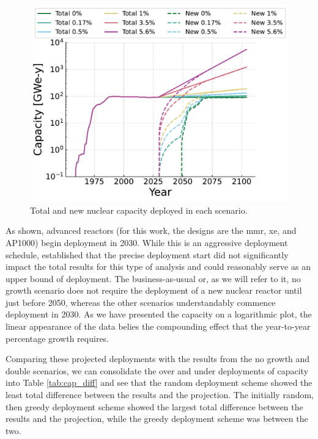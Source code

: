 \begin{figure}[H]
    \centering
    \includegraphics[scale=0.7]{images/results/deployment_calcs/total_new_capacity_scenarios.pdf}
    \caption{Total and new nuclear capacity deployed in each scenario.}
    \label{fig:dep_goals}
\end{figure}

As shown, advanced reactors (for this work, the designs are the \gls{mmr},
\gls{xe}, and AP1000) begin deployment in 2030. While this is an aggressive deployment schedule, \cite{bachmann_thesis_2023} established that the precise deployment start did not significantly impact the total results for this type of analysis and could reasonably serve as an upper bound of deployment. The business-as-usual or, as we will refer to it, no growth scenario does not require the deployment of a new nuclear reactor until just before 2050, whereas the other scenarios understandably commence deployment in 2030. As we have presented the capacity on a logarithmic plot, the linear appearance of the data belies the compounding effect that the year-to-year percentage growth requires.

Comparing these projected deployments with the results from the no growth and double scenarios, we can consolidate the over and under deployments of capacity into Table \ref{tab:cap_diff} and see that the random deployment scheme showed the least total difference between the results and the projection. The initially random, then greedy deployment scheme showed the largest total difference between the results and the projection, while the greedy deployment scheme was between the two.

